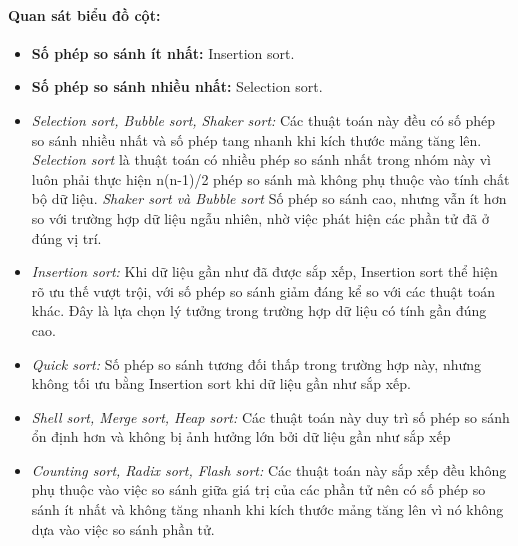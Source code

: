    \paragraph{Quan sát biểu đồ cột:}
    \begin{itemize}
        \item \textbf{Số phép so sánh ít nhất:} Insertion sort.
        \item \textbf{Số phép so sánh nhiều nhất:} Selection sort.
        \item \textit{Selection sort, Bubble sort, Shaker sort:} Các thuật toán này đều có số phép so sánh nhiều nhất và số phép tang nhanh khi kích thước mảng tăng lên. \textit{Selection sort} là thuật toán có nhiều phép so sánh nhất trong nhóm này vì luôn phải thực hiện n(n-1)/2 phép so sánh mà không phụ thuộc vào tính chất bộ dữ liệu. \textit{Shaker sort và Bubble sort} Số phép so sánh cao, nhưng vẫn ít hơn so với trường hợp dữ liệu ngẫu nhiên, nhờ việc phát hiện các phần tử đã ở đúng vị trí.
        \item \textit{Insertion sort: }Khi dữ liệu gần như đã được sắp xếp, Insertion sort thể hiện rõ ưu thế vượt trội, với số phép so sánh giảm đáng kể so với các thuật toán khác. Đây là lựa chọn lý tưởng trong trường hợp dữ liệu có tính gần đúng cao.
        \item \textit{Quick sort: }Số phép so sánh tương đối thấp trong trường hợp này, nhưng không tối ưu bằng Insertion sort khi dữ liệu gần như sắp xếp.
        \item \textit{Shell sort, Merge sort, Heap sort: }Các thuật toán này duy trì số phép so sánh ổn định hơn và không bị ảnh hưởng lớn bởi dữ liệu gần như sắp xếp
        \item \textit{Counting sort, Radix sort, Flash sort:} Các thuật toán này sắp xếp đều không phụ thuộc vào việc so sánh giữa giá trị của các phần tử nên có số phép so sánh ít nhất và không tăng nhanh khi kích thước mảng tăng lên vì nó không dựa vào việc so sánh phần tử.
    \end{itemize}

\newpage
